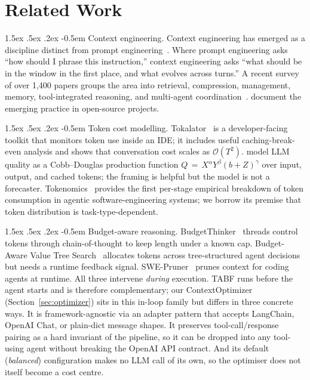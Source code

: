 \documentclass{article}
\makeatletter
\renewcommand\paragraph{%
  \@startsection{paragraph}{4}{\z@}%
    {1.5ex \@plus.5ex \@minus.2ex}%
    {-0.5em}%
    {\normalfont\normalsize\bfseries}%
}
\makeatother
\begin{document}
\section{Related Work}
\label{sec:related}

\paragraph{Context engineering.}
Context engineering has emerged as a discipline distinct from prompt
engineering~\citep{mei2025}. Where prompt engineering asks ``how should I
phrase this instruction,'' context engineering asks ``what should be in the
window in the first place, and what evolves across turns.'' A recent survey
of over 1{,}400 papers groups the area into retrieval, compression,
management, memory, tool-integrated reasoning, and multi-agent
coordination~\citep{mei2025}. \citet{mohsenimofidi2025} document the
emerging practice in open-source projects.

\paragraph{Token cost modelling.}
Tokalator~\citep{tokalator2026} is a developer-facing toolkit that
monitors token use inside an IDE; it includes useful caching-break-even
analysis and shows that conversation cost scales as $\mathcal{O}(T^2)$.
\citet{bergemann2025} model LLM quality as a Cobb--Douglas production
function $Q\,{=}\,X^{\alpha}Y^{\beta}(b+Z)^{\gamma}$ over input, output,
and cached tokens; the framing is helpful but the model is not a
forecaster. Tokenomics~\citep{salim2025} provides the first per-stage
empirical breakdown of token consumption in agentic software-engineering
systems; we borrow its premise that token distribution is
task-type-dependent.

\paragraph{Budget-aware reasoning.}
BudgetThinker~\citep{wen2025} threads control tokens through
chain-of-thought to keep length under a known cap. Budget-Aware Value Tree
Search~\citep{li2025budget} allocates tokens across tree-structured
agent decisions but needs a runtime feedback signal.
SWE-Pruner~\citep{wang2025swepruner} prunes context for coding agents at runtime.
All three intervene \emph{during} execution. TABF runs before the agent
starts and is therefore complementary; our ContextOptimizer
(Section~\ref{sec:optimizer}) sits in this in-loop family but differs in
three concrete ways. It is framework-agnostic via an adapter pattern that
accepts LangChain, OpenAI Chat, or plain-dict message shapes. It preserves
tool-call/response pairing as a hard invariant of the pipeline, so it can
be dropped into any tool-using agent without breaking the OpenAI API
contract. And its default (\emph{balanced}) configuration makes no LLM
call of its own, so the optimiser does not itself become a cost centre.
\end{document}
